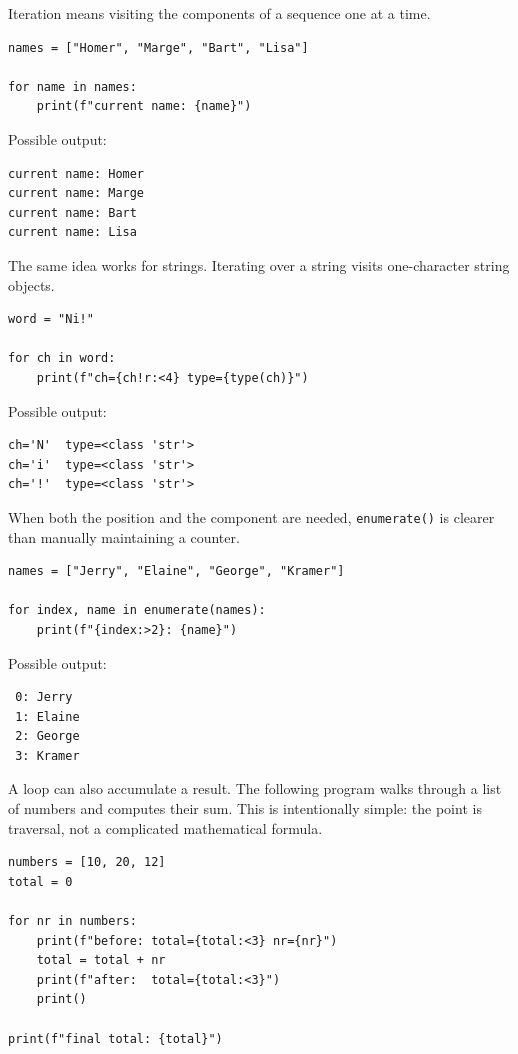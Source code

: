 Iteration means visiting the components of a sequence one at a time.

\begin{verbatim}
names = ["Homer", "Marge", "Bart", "Lisa"]

for name in names:
    print(f"current name: {name}")
\end{verbatim}

Possible output:

\begin{verbatim}
current name: Homer
current name: Marge
current name: Bart
current name: Lisa
\end{verbatim}

The same idea works for strings. Iterating over a string visits one-character string objects.

\begin{verbatim}
word = "Ni!"

for ch in word:
    print(f"ch={ch!r:<4} type={type(ch)}")
\end{verbatim}

Possible output:

\begin{verbatim}
ch='N'  type=<class 'str'>
ch='i'  type=<class 'str'>
ch='!'  type=<class 'str'>
\end{verbatim}

When both the position and the component are needed, \texttt{enumerate()} is clearer than manually maintaining a counter.

\begin{verbatim}
names = ["Jerry", "Elaine", "George", "Kramer"]

for index, name in enumerate(names):
    print(f"{index:>2}: {name}")
\end{verbatim}

Possible output:

\begin{verbatim}
 0: Jerry
 1: Elaine
 2: George
 3: Kramer
\end{verbatim}

A loop can also accumulate a result. The following program walks through a list of numbers and computes their sum. This is intentionally simple: the point is traversal, not a complicated mathematical formula.

\begin{verbatim}
numbers = [10, 20, 12]
total = 0

for nr in numbers:
    print(f"before: total={total:<3} nr={nr}")
    total = total + nr
    print(f"after:  total={total:<3}")
    print()

print(f"final total: {total}")
\end{verbatim}

